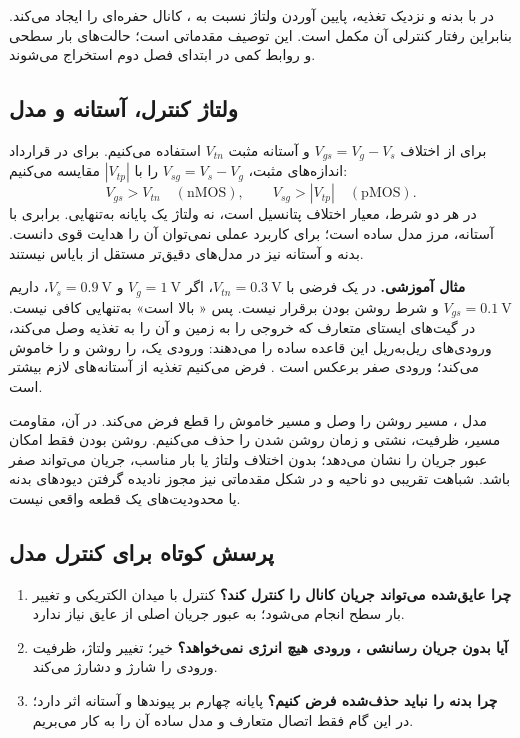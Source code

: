در  با بدنه و  نزدیک تغذیه، پایین آوردن ولتاژ
 نسبت به ، کانال حفره‌ای را ایجاد می‌کند.
بنابراین رفتار کنترلی آن مکمل  است.
این توصیف مقدماتی است؛ حالت‌های بار سطحی و روابط کمی در ابتدای فصل دوم استخراج می‌شوند.

\subsection{ولتاژ کنترل، آستانه و مدل }
برای  از اختلاف \(V_{gs}=V_g-V_s\) و آستانه مثبت \(V_{tn}\)
استفاده می‌کنیم. برای  در قرارداد اندازه‌های مثبت،
\(V_{sg}=V_s-V_g\) را با \(|V_{tp}|\) مقایسه می‌کنیم:
\begin{equation}\label{eq:ch1-threshold}
V_{gs}>V_{tn}\quad(\mathrm{nMOS}),\qquad
V_{sg}>|V_{tp}|\quad(\mathrm{pMOS}).
\end{equation}
در هر دو شرط، معیار اختلاف پتانسیل است، نه ولتاژ یک پایانه به‌تنهایی.
برابری با آستانه، مرز مدل ساده است؛ برای کاربرد عملی نمی‌توان آن را هدایت قوی دانست.
بدنه و آستانه نیز در مدل‌های دقیق‌تر مستقل از بایاس نیستند.

\textbf{مثال آموزشی.} در یک  فرضی با \(V_{tn}=\qty{0.3}{\volt}\)،
اگر \(V_g=\qty{1}{\volt}\) و \(V_s=\qty{0.9}{\volt}\)،
داریم \(V_{gs}=\qty{0.1}{\volt}\) و شرط روشن بودن برقرار نیست.
پس « بالا است» به‌تنهایی کافی نیست.
در گیت‌های ایستای متعارف که  خروجی را به زمین و  آن را
به تغذیه وصل می‌کند، ورودی‌های ریل‌به‌ریل این قاعده ساده را می‌دهند:
ورودی یک،  را روشن و  را خاموش می‌کند؛ ورودی صفر برعکس است
\cite[اسلاید ۲۱]{intro}. فرض می‌کنیم تغذیه از آستانه‌های لازم بیشتر است.

مدل ، مسیر روشن را وصل و مسیر خاموش را قطع فرض می‌کند.
در آن، مقاومت مسیر، ظرفیت، نشتی و زمان روشن شدن را حذف می‌کنیم.
روشن بودن فقط امکان عبور جریان را نشان می‌دهد؛ بدون اختلاف ولتاژ یا بار مناسب،
جریان می‌تواند صفر باشد. شباهت تقریبی دو ناحیه  و 
در شکل مقدماتی نیز مجوز نادیده گرفتن دیودهای بدنه یا محدودیت‌های یک قطعه واقعی نیست.

\subsection{پرسش کوتاه برای کنترل مدل}
\begin{enumerate}
\item \textbf{چرا  عایق‌شده می‌تواند جریان کانال را کنترل کند؟}
کنترل با میدان الکتریکی و تغییر بار سطح انجام می‌شود؛ به عبور جریان اصلی از عایق نیاز ندارد.
\item \textbf{آیا بدون جریان رسانشی ، ورودی هیچ انرژی نمی‌خواهد؟}
خیر؛ تغییر ولتاژ، ظرفیت ورودی را شارژ و دشارژ می‌کند.
\item \textbf{چرا بدنه را نباید حذف‌شده فرض کنیم؟}
پایانه چهارم بر پیوندها و آستانه اثر دارد؛ در این گام فقط اتصال متعارف و مدل ساده آن را به کار می‌بریم.
\end{enumerate}
